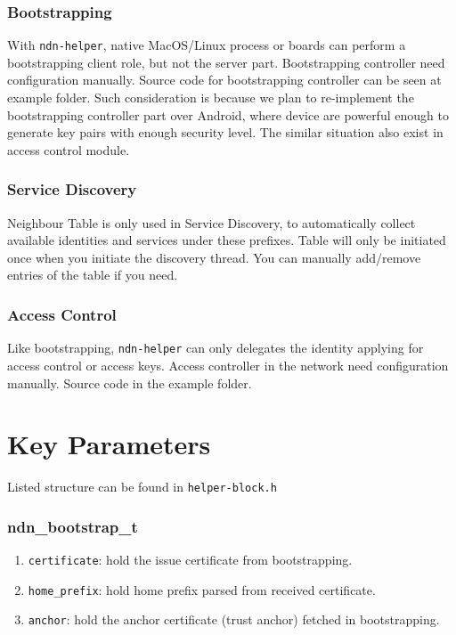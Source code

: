 \documentclass[a4paper, 11pt]{article}
\begin{document}
        \subsubsection*{Bootstrapping}
        With \texttt{ndn-helper}, native MacOS/Linux process or boards can perform a bootstrapping client role, but not the server part. Bootstrapping controller need configuration manually. Source code for bootstrapping controller can be seen at example folder. Such consideration is because we plan to re-implement the bootstrapping controller part over Android, where device are powerful enough to generate key pairs with enough security level. The similar situation also exist in access control module.
        
        \subsubsection*{Service Discovery}
        Neighbour Table is only used in Service Discovery, to automatically collect available identities and services under these prefixes. Table will only be initiated once when you initiate the discovery thread. You can manually add/remove entries of the table if you need.
        
        \subsubsection*{Access Control}
        Like bootstrapping, \texttt{ndn-helper} can only delegates the identity applying for access control or access keys. Access controller in the network need configuration manually. Source code in the example folder.
        
        \section*{Key Parameters}
        Listed structure can be found in \texttt{helper-block.h} 

        \subsubsection*{ndn\_bootstrap\_t}
        \begin{enumerate}
        \item \texttt{certificate}: hold the issue certificate from bootstrapping.
        \item \texttt{home\_prefix}: hold home prefix parsed from received certificate.
        \item \texttt{anchor}: hold the anchor certificate (trust anchor) fetched in bootstrapping.
        \end{enumerate}
\end{document}
